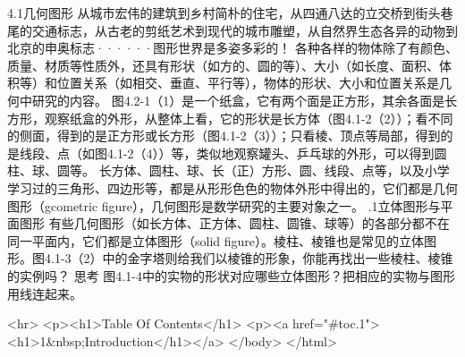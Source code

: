 \beginconcept
4.1几何图形\newline
从城市宏伟的建筑到乡村简朴的住宅，从四通八达的立交桥到街头巷尾的交通标志，从古老的剪纸艺术到现代的城市雕塑，从自然界生态各异的动物到北京的申奥标志······图形世界是多姿多彩的！\newline
各种各样的物体除了有颜色、质量、材质等性质外，还具有形状（如方的、圆的等）、大小（如长度、面积、体积等）和位置关系（如相交、垂直、平行等），物体的形状、大小和位置关系是几何中研究的内容。\newline
图4.2-1（1）是一个纸盒，它有两个面是正方形，其余各面是长方形，观察纸盒的外形，从整体上看，它的形状是长方体（图4.1-2（2））；看不同的侧面，得到的是正方形或长方形（图4.1-2（3））；只看棱、顶点等局部，得到的是线段、点（如图4.1-2（4））等，类似地观察罐头、乒乓球的外形，可以得到圆柱、球、圆等。\newline
长方体、圆柱、球、长（正）方形、圆、线段、点等，以及小学学习过的三角形、四边形等，都是从形形色色的物体外形中得出的，它们都是几何图形（gcometric figure），几何图形是数学研究的主要对象之一。\newline
\endconcept
{}.1立体图形与平面图形\newline
有些几何图形（如长方体、正方体、圆柱、圆锥、球等）的各部分都不在同一平面内，它们都是立体图形（solid figure）。棱柱、棱锥也是常见的立体图形。图4.1-3（2）中的金字塔则给我们以棱锥的形象，你能再找出一些棱柱、棱锥的实例吗？\newline
\endarticle
\beginexercise
思考\newline
图4.1-4中的实物的形状对应哪些立体图形？把相应的实物与图形用线连起来。\newline
\endexercise

\enddocument

<hr>
<p><h1>Table Of Contents</h1>
<p><a href="#toc.1"><h1>1&nbsp;Introduction</h1></a>
</body>
</html>
